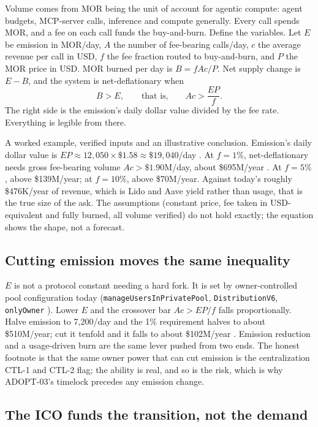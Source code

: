 \documentclass[11pt,a4paper]{article}
\newcommand{\code}[1]{\texttt{\small #1}}
\newcommand{\prov}[1]{{\color{muted}\footnotesize\sffamily[#1]}}
\begin{document}
Volume comes from MOR being the unit of account for agentic compute: agent budgets, MCP-server
calls, inference and compute generally. Every call spends MOR, and a fee on each call funds the
buy-and-burn. Define the variables. Let $E$ be emission in MOR/day, $A$ the number of
fee-bearing calls/day, $c$ the average revenue per call in USD, $f$ the fee fraction routed to
buy-and-burn, and $P$ the MOR price in USD. MOR burned per day is $B = fAc/P$. Net supply change
is $E - B$, and the system is net-deflationary when
\[
  B > E, \qquad\text{that is,}\qquad Ac > \frac{EP}{f}.
\]
The right side is the emission's daily dollar value divided by the fee rate. Everything is
legible from there.

A worked example, verified inputs and an illustrative conclusion. Emission's daily dollar value
is $EP \approx 12{,}050 \times \$1.58 \approx \$19{,}040$/day \prov{derived}. At $f = 1\%$,
net-deflationary needs gross fee-bearing volume $Ac > \$1.90$M/day, about \$695M/year
\prov{illustrative}. At $f = 5\%$, above \$139M/year; at $f = 10\%$, above \$70M/year. Against
today's roughly \$476K/year of revenue, which is Lido and Aave yield rather than usage, that is
the true size of the ask. The assumptions (constant price, fee taken in USD-equivalent and
fully burned, all volume verified) do not hold exactly; the equation shows the shape, not a
forecast.

\subsection{Cutting emission moves the same inequality}

$E$ is not a protocol constant needing a hard fork. It is set by owner-controlled pool
configuration today (\code{manageUsersInPrivatePool}, \code{DistributionV6}, \code{onlyOwner}
\prov{verified}). Lower $E$ and the crossover bar $Ac > EP/f$ falls proportionally. Halve
emission to 7,200/day and the 1\% requirement halves to about \$510M/year; cut it tenfold and it
falls to about \$102M/year \prov{illustrative}. Emission reduction and a usage-driven burn are
the same lever pushed from two ends. The honest footnote is that the same owner power that can
cut emission is the centralization CTL-1 and CTL-2 flag; the ability is real, and so is the
risk, which is why ADOPT-03's timelock precedes any emission change.

\subsection{The ICO funds the transition, not the demand}
\end{document}
